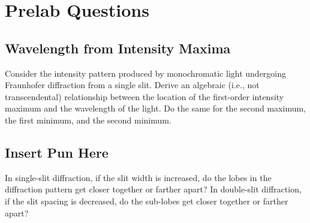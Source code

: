 \documentclass[]{manual}
\begin{document}

    \newpage
    \FloatBarrier

    \section{Prelab Questions}
    \setcounter{subsection}{0}

    \subsection{Wavelength from Intensity Maxima}

    Consider the intensity pattern produced by monochromatic light undergoing Fraunhofer diffraction from a single slit.
    Derive an algebraic (i.e., not transcendental) relationship between the location of the first-order intensity maximum and the wavelength of the light.
    Do the same for the second maximum, the first minimum, and the second minimum.


    \subsection{Insert Pun Here}
    
    In single-slit diffraction, if the slit width is increased, do the lobes in the diffraction pattern get closer together or farther apart?
    In double-slit diffraction, if the slit spacing is decreased, do the sub-lobes get closer together or farther apart?
    
\end{document}

